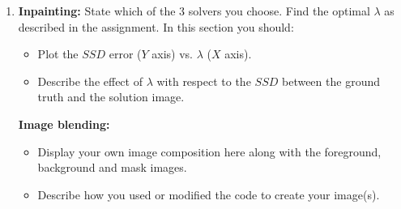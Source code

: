 \documentclass{paper}
\begin{document}
\begin{enumerate}
\item \textbf{Inpainting:} State which of the 3 solvers you choose. Find the optimal $\lambda$ as described in the assignment. In this section you should:
\begin{itemize}
\item Plot the $SSD$ error ($Y$ axis) vs. $\lambda$ ($X$ axis).
\item Describe the effect of $\lambda$ with respect to the $SSD$ between the ground truth and the solution image.
\end{itemize}
\textbf{Image blending:} 
\begin{itemize}
\item Display your own image composition here along with the foreground, background and mask images.
\item Describe how you used or modified the code to create your image(s).
\end{itemize}


\end{enumerate}


 
\end{document}
